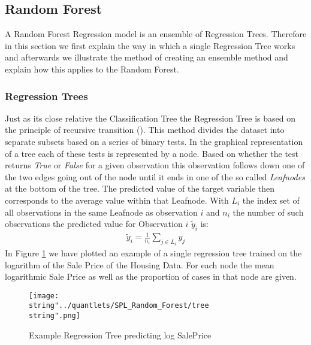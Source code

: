 \subsection{Random Forest}
A Random Forest Regression model is an ensemble of Regression Trees. Therefore in this section we first explain the way in which a single Regression Tree works and afterwards we illustrate the method of creating an ensemble method and explain how this applies to the Random Forest.
\subsubsection{Regression Trees}
Just as its close relative the Classification Tree the Regression Tree is based on the principle of recursive transition (\cite{liaw_classification_2002}). This method divides the dataset into separate subsets based on a series of binary tests. In the graphical representation of a tree each of these tests is represented by a node. Based on whether the test returns \textit{True} or \textit{False} for a given observation this observation follows down one of the two edges going out of the node until it ends in one of the so called \textit{Leafnodes} at the bottom of the tree. The predicted value of the target variable then corresponds to the average value within that Leafnode. With $L_i$ the index set of all observations in the same Leafnode as observation $i$ and $n_i$ the number of such observations the predicted value for Observation $i$ $\tilde{y}_i$ is:
\begin{align}
\tilde{y}_i = \frac{1}{n_i}\sum_{j \in L_i} y_j
\end{align}
In Figure  \ref{fig:tree} we have plotted an example of a single regression tree trained on the logarithm of the Sale Price of the Housing Data. For each node the mean logarithmic Sale Price as well as the proportion of cases in that node are given. 
\begin{figure}
  \centering
\texttt{[image: \\string"../quantlets/SPL\_Random\_Forest/tree\\string".png]}
  \caption{Example Regression Tree predicting log SalePrice}\label{fig:tree}
\end{figure}

